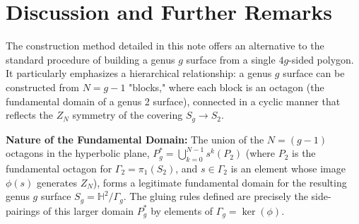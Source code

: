 \documentclass{article}
\theoremstyle{definition}
\theoremstyle{remark}
\begin{document}
\section{Discussion and Further Remarks}
The construction method detailed in this note offers an alternative to the standard procedure of building a genus $g$ surface from a single $4g$-sided polygon. It particularly emphasizes a hierarchical relationship: a genus $g$ surface can be constructed from $N=g-1$ "blocks," where each block is an octagon (the fundamental domain of a genus 2 surface), connected in a cyclic manner that reflects the $Z_N$ symmetry of the covering $S_g \to S_2$.

\textbf{Nature of the Fundamental Domain:}
The union of the $N=(g-1)$ octagons in the hyperbolic plane, $P_g^* = \bigcup_{k=0}^{N-1} s^k(P_2)$ (where $P_2$ is the fundamental octagon for $\Gamma_2 = \pi_1(S_2)$, and $s \in \Gamma_2$ is an element whose image $\phi(s)$ generates $Z_N$), forms a legitimate fundamental domain for the resulting genus $g$ surface $S_g = \mathbb{H}^2/\Gamma_g$. The gluing rules defined are precisely the side-pairings of this larger domain $P_g^*$ by elements of $\Gamma_g = \ker(\phi)$.
\end{document}
